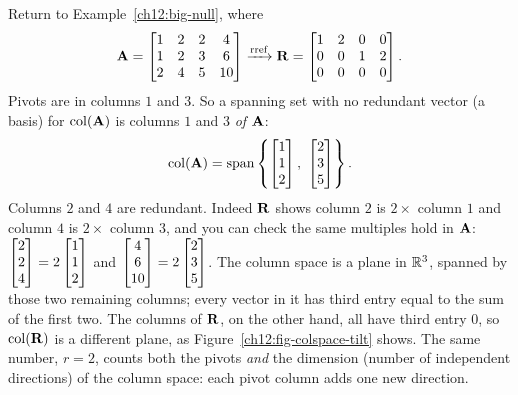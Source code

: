 \begin{example}\label{ch12:colspace-basis}
Return to Example~\ref{ch12:big-null}, where
\[
  \mathbf{A} = \begin{bmatrix} 1 & 2 & 2 & 4 \\ 1 & 2 & 3 & 6 \\ 2 & 4 & 5 & 10
  \end{bmatrix}
  \xrightarrow{\text{rref}}
  \mathbf{R} = \begin{bmatrix} 1 & 2 & 0 & 0 \\ 0 & 0 & 1 & 2 \\ 0 & 0 & 0 & 0
  \end{bmatrix}.
\]
Pivots are in columns $1$ and $3$. So a spanning set with no redundant vector (a basis) for $\operatorname{col}(\mathbf{A})$ is columns $1$
and $3$ \emph{of $\mathbf{A}$}:
\[
  \col(\mat{A}) = \spn\left\{\colvec{1\\1\\2},\ \colvec{2\\3\\5}\right\}.
\]
Columns $2$ and $4$ are redundant. Indeed $\mathbf{R}$ shows column $2$ is $2\times$
column $1$ and column $4$ is $2\times$ column $3$, and you can check the same
multiples hold in $\mathbf{A}$: $\begin{bmatrix}2\\2\\4\end{bmatrix}=2\begin{bmatrix}1\\1\\2\end{bmatrix}$ and
$\begin{bmatrix}4\\6\\10\end{bmatrix}=2\begin{bmatrix}2\\3\\5\end{bmatrix}$. The column space is a plane in $\mathbb{R}^3$,
spanned by those two remaining columns; every vector in it has third entry equal
to the sum of the first two. The columns of $\mathbf{R}$, on the other hand, all
have third entry $0$, so $\operatorname{col}(\mathbf{R})$ is a different plane, as
Figure~\ref{ch12:fig-colspace-tilt} shows. The same number, $r=2$, counts both the pivots \emph{and} the dimension (number of independent directions) of the column space:
each pivot column adds one new direction.
\end{example}

